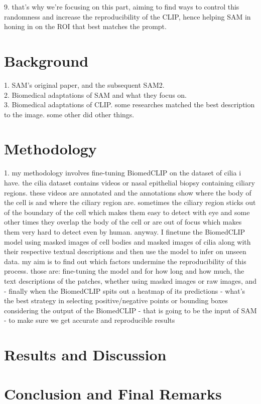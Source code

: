 \documentclass[./dissertation.tex]{subfiles}
\begin{document}
9. that's why we're focusing on this part, aiming to find ways to control this randomness and increase the reproducibility of the CLIP, hence helping SAM in honing in on the ROI that best matches the prompt.


\section{Background}

1. SAM's original paper, and the subsequent SAM2. \\

2. Biomedical adaptations of SAM and what they focus on. \\

3. Biomedical adaptations of CLIP. some researches matched the best description to the image. some other did other things. \\


\section{Methodology}
1. my methodology involves fine-tuning BiomedCLIP on the dataset of cilia i have. the cilia dataset contains videos or nasal epithelial biopsy containing ciliary regions. these videos are annotated and the annotations show where the body of the cell is and where the ciliary region are. sometimes the ciliary region sticks out of the boundary of the cell which makes them easy to detect with eye and some other times they overlap the body of the cell or are out of focus which makes them very hard to detect even by human. anyway. I finetune the BiomedCLIP model using masked images of cell bodies and masked images of cilia along with their respective textual descriptions and then use the model to infer on unseen data. my aim is to find out which factors undermine the reproducibility of this process. those are: fine-tuning the model and for how long and how much, the text descriptions of the patches, whether using masked images or raw images, and - finally when the BiomedCLIP spits out a heatmap of its predictions - what's the best strategy in selecting positive/negative points or bounding boxes considering the output of the BiomedCLIP - that is going to be the input of SAM - to make sure we get accurate and reproducible results

\section{Results and Discussion}

\section{Conclusion and Final Remarks}
\end{document}
